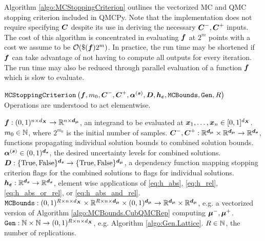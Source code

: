 \documentclass{article}[12pt]
\begin{document}
Algorithm \ref{algo:MCStoppingCriterion} outlines the vectorized MC and QMC stopping criterion included in QMCPy. Note that the implementation does not require specifying $\bC$ despite its use in deriving the necessary $\bC^-,\bC^+$ inputs. The cost of this algorithm is concentrated in evaluating $\bf$ at $2^m$ points with a cost we assume to be $\calO(\$(\bf)2^m)$. In practice, the run time may be shortened if $\bf$ can take advantage of not having to compute all outputs for every iteration. The run time may also be reduced through parallel evaluation of a function $\bf$ which is slow to evaluate. %

\begin{algorithm}[h!]
    \caption{$\texttt{MCStoppingCriterion}\left(\bf,m_0,\bC^-,\bC^+,\balpha^{(\bs)}, \bD, \bh_{\bvarepsilon}, \texttt{MCBounds}, \texttt{Gen}, R \right)$ \\ Operations are understood to act elementwise.}
    \label{algo:MCStoppingCriterion}
    \begin{algorithmic}
    \Require $\bf: (0,1)^{n \times {d_{\bX}}} \to \bbR^{n \times \bd_{\bmu}}$, an integrand to be evaluated at $\bx_1,\dots,\bx_n \in [0,1]^{d_{\bX}}$.
    \Require $m_0 \in \bbN$, where $2^{m_0}$ is the initial number of samples.
    \Require $\bC^-,\bC^+: \bbR^{\bd_{\bmu}} \times \bbR^{\bd_{\bmu}} \to \bbR^{\bd_{\bs}}$, functions propagating individual solution bounds to combined solution bounds.
    \Require $\balpha^{(\bs)} \in (0,1)^{\bd_{\bs}}$, the desired uncertainty levels for combined solutions.
    \Require $\bD: \tfset^{\bd_{\bs}} \to \tfset^{\bd_{\bmu}}$, a dependency function mapping stopping criterion flags for the combined solutions to flags for individual solutions. 
    \Require $\bh_{\bvarepsilon}: \bbR^{\bd_{\bs}} \to \bbR^{\bd_{\bs}}$, element wise applications of \eqref{eq:h_abs}, \eqref{eq:h_rel}, \eqref{eq:h_abs_or_rel}, or \eqref{eq:h_abs_and_rel}. 
    \Require $\texttt{MCBounds}: (0,1)^{R \times n \times d_{\bX}} \times \bbR^{R \times n \times \bd_{\bmu}} \times (0,1)^{\bd_{\bmu}} \to \bbR^{\bd_{\bmu}} \times \bbR^{\bd_{\bmu}}$, e.g. a vectorized version of Algorithm \ref{algo:MCBounds.CubQMCRep} computing $\bmu^-,\bmu^+$.
    \Require $\texttt{Gen}: \bbN \times \bbN \to (0,1)^{R \times n \times d_{\bX}}$, e.g. Algorithm \ref{algo:Gen.Lattice}. 
    \Require $R \in \bbN$, the number of replications.
    \\ \hrulefill

\end{algorithmic}
\end{algorithm}
\end{document}
